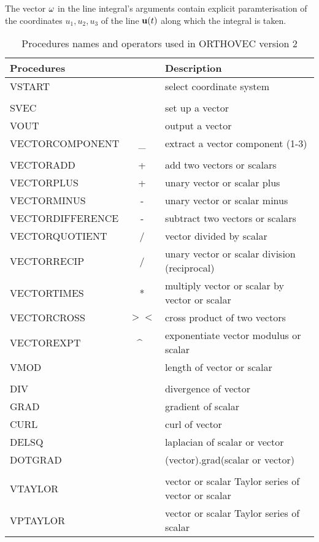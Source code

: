 The vector ${\bf \omega}$ in the line 
integral's arguments contain explicit paramterisation 
of the coordinates $u_1, u_2, u_3$ of the
line ${\bf u}(t)$ along which the integral is taken.

\begin{table}
\centering
\caption{Procedures names and operators used in ORTHOVEC version 2}
\vspace*{5mm}
\begin{tabular}{|l c l|} \hline 
Procedures & & Description \\ \hline 
VSTART & & select coordinate system \\ & & \\ 
SVEC   & & set up a vector \\ 
VOUT & & output a vector \\
VECTORCOMPONENT & \_ & extract a vector component (1-3) \\
 & & \\
VECTORADD & + & add two vectors or scalars \\ 
VECTORPLUS & + & unary vector or scalar plus\\ 
VECTORMINUS & - & unary vector or scalar minus\\ 
VECTORDIFFERENCE & - & subtract two vectors or scalars \\ 
VECTORQUOTIENT & / & vector divided by scalar \\ 
VECTORRECIP & / & unary vector or scalar division (reciprocal)\\ 
VECTORTIMES & * & multiply vector or scalar by vector or scalar \\ 
VECTORCROSS & $><$ & cross product of two vectors \\ 
VECTOREXPT & \^~ & exponentiate vector modulus or scalar \\
VMOD & & length of vector or scalar \\ & & \\ 
DIV & & divergence of vector \\ 
GRAD & & gradient of scalar \\ 
CURL & & curl of vector \\ 
DELSQ & & laplacian of scalar or vector \\ 
DOTGRAD & & (vector).grad(scalar or vector) \\ & &  \\ 
VTAYLOR & & vector or scalar Taylor series of vector or scalar \\ 
VPTAYLOR & & vector or scalar Taylor series of scalar \\ 

\end{tabular}
\end{table}

